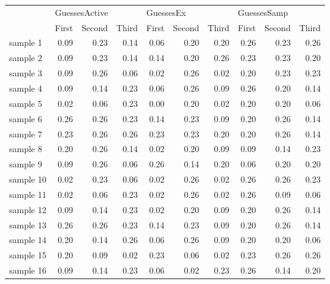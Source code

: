 \begin{table}
\begin{tabular}{lrrrrrrrrr}
\toprule
 & \multicolumn{3}{l}{GuessesActive} & \multicolumn{3}{l}{GuessesEx} & \multicolumn{3}{l}{GuessesSamp} \\
 &             First &     Second &     Third &   First &     Second &     Third &     First &     Second &  Third \\
\midrule
sample 1  &          0.09 &  0.23 &  0.14 &      0.06 &  0.20 &  0.20 &        0.26 &  0.23 &  0.26 \\
sample 2  &          0.09 &  0.23 &  0.14 &      0.14 &  0.20 &  0.26 &        0.23 &  0.23 &  0.20 \\
sample 3  &          0.09 &  0.26 &  0.06 &      0.02 &  0.26 &  0.02 &        0.20 &  0.23 &  0.23 \\
sample 4  &          0.09 &  0.14 &  0.23 &      0.06 &  0.26 &  0.09 &        0.26 &  0.20 &  0.14 \\
sample 5  &          0.02 &  0.06 &  0.23 &      0.00 &  0.20 &  0.02 &        0.20 &  0.20 &  0.06 \\
sample 6  &          0.26 &  0.26 &  0.23 &      0.14 &  0.23 &  0.09 &        0.20 &  0.26 &  0.14 \\
sample 7  &          0.23 &  0.26 &  0.26 &      0.23 &  0.23 &  0.20 &        0.20 &  0.26 &  0.14 \\
sample 8  &          0.20 &  0.26 &  0.14 &      0.02 &  0.20 &  0.09 &        0.09 &  0.14 &  0.23 \\
sample 9  &          0.09 &  0.26 &  0.06 &      0.26 &  0.14 &  0.20 &        0.06 &  0.20 &  0.20 \\
sample 10 &          0.02 &  0.23 &  0.06 &      0.02 &  0.26 &  0.02 &        0.26 &  0.26 &  0.23 \\
sample 11 &          0.02 &  0.06 &  0.23 &      0.02 &  0.26 &  0.02 &        0.26 &  0.09 &  0.06 \\
sample 12 &          0.09 &  0.14 &  0.23 &      0.02 &  0.20 &  0.09 &        0.20 &  0.26 &  0.14 \\
sample 13 &          0.26 &  0.26 &  0.23 &      0.14 &  0.23 &  0.09 &        0.20 &  0.26 &  0.14 \\
sample 14 &          0.20 &  0.14 &  0.26 &      0.06 &  0.26 &  0.09 &        0.20 &  0.20 &  0.06 \\
sample 15 &          0.20 &  0.09 &  0.02 &      0.23 &  0.06 &  0.02 &        0.23 &  0.26 &  0.26 \\
sample 16 &          0.09 &  0.14 &  0.23 &      0.06 &  0.02 &  0.23 &        0.26 &  0.14 &  0.20 \\

\end{tabular}
\end{table}
